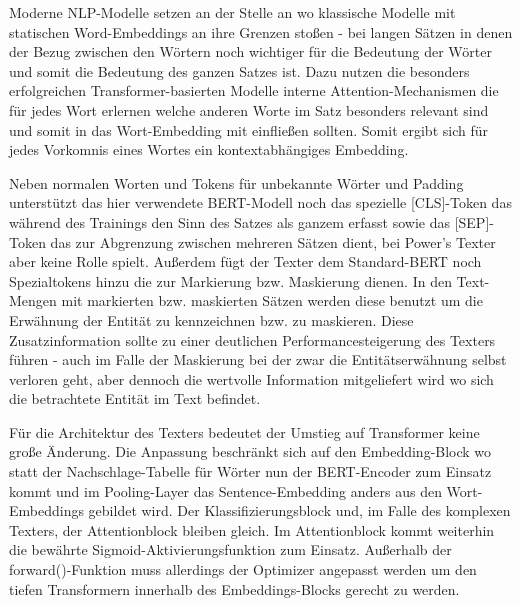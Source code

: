 Moderne NLP-Modelle setzen an der Stelle an wo klassische Modelle mit statischen Word-Embeddings an ihre Grenzen stoßen - bei langen Sätzen in denen der Bezug zwischen den Wörtern noch wichtiger für die Bedeutung der Wörter und somit die Bedeutung des ganzen Satzes ist. Dazu nutzen die besonders erfolgreichen Transformer-basierten Modelle interne Attention-Mechanismen die für jedes Wort erlernen welche anderen Worte im Satz besonders relevant sind und somit in das Wort-Embedding mit einfließen sollten. Somit ergibt sich für jedes Vorkomnis eines Wortes ein kontextabhängiges Embedding.

Neben normalen Worten und Tokens für unbekannte Wörter und Padding unterstützt das hier verwendete BERT-Modell noch das spezielle [CLS]-Token das während des Trainings den Sinn des Satzes als ganzem erfasst sowie das [SEP]-Token das zur Abgrenzung zwischen mehreren Sätzen dient, bei Power's Texter aber keine Rolle spielt. Außerdem fügt der Texter dem Standard-BERT noch Spezialtokens hinzu die zur Markierung bzw. Maskierung dienen. In den Text-Mengen mit markierten bzw. maskierten Sätzen werden diese benutzt um die Erwähnung der Entität zu kennzeichnen bzw. zu maskieren. Diese Zusatzinformation sollte zu einer deutlichen Performancesteigerung des Texters führen - auch im Falle der Maskierung bei der zwar die Entitätserwähnung selbst verloren geht, aber dennoch die wertvolle Information mitgeliefert wird wo sich die betrachtete Entität im Text befindet.

Für die Architektur des Texters bedeutet der Umstieg auf Transformer keine große Änderung. Die Anpassung beschränkt sich auf den Embedding-Block wo statt der Nachschlage-Tabelle für Wörter nun der BERT-Encoder zum Einsatz kommt und im Pooling-Layer das Sentence-Embedding anders aus den Wort-Embeddings gebildet wird. Der Klassifizierungsblock und, im Falle des komplexen Texters, der Attentionblock bleiben gleich. Im Attentionblock kommt weiterhin die bewährte Sigmoid-Aktivierungsfunktion zum Einsatz. Außerhalb der forward()-Funktion muss allerdings der Optimizer angepasst werden um den tiefen Transformern innerhalb des Embeddings-Blocks gerecht zu werden.

